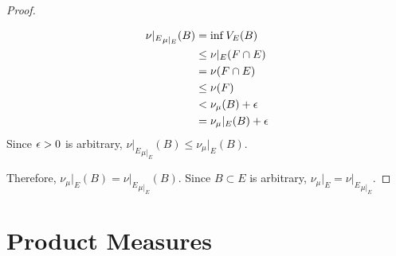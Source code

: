 \documentclass{book}
\begin{document}
\begin{proof}
\begin{itemize}
			\begin{align*}
				{\nu|_E}_{\mu|_E}(B) 
				& = \inf V_E(B) \\
				& \leq \nu|_E(F \cap E) \\
				& = \nu(F \cap E) \\
				& \leq \nu(F) \\
				& < \nu_{\mu}(B) + \epsilon \\
				& = \nu_{\mu}|_E(B) + \epsilon 
			\end{align*}
			Since $\epsilon > 0$ is arbitrary, ${\nu|_E}_{\mu|_E}(B) \leq \nu_{\mu}|_E(B)$. 
		\end{itemize}
		Therefore, $\nu_{\mu}|_E(B) = {\nu|_E}_{\mu|_E}(B)$. Since $B \subset E$ is arbitrary, $\nu_{\mu}|_E = {\nu|_E}_{\mu|_E}$.
	\end{proof}
	
	
	
	
	
	
	
	
	
	
	
	
	
	
	
	
	
	
	
	
	
	
	
	
	
	
	
	
	
	
	
	
	
	
	
	
	
	
	\newpage
	\section{Product Measures}
	
\end{document}
